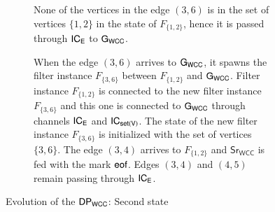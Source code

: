 \begin{figure}[h!]
\centering
\begin{subfigure}[b]{\textwidth}
 \centering
  \caption{None of the vertices in the edge $(3,6)$ is in the set of vertices $\{1,2\}$ in the state of $F_{\{1,2\}}$, hence it is passed through $\mathsf{IC_E}$ to $\mathsf{G_{WCC}}$.}
  \label{fig:dp_example_3_4a}
\end{subfigure}
\vspace{.3cm}

\begin{subfigure}[b]{\textwidth}
 \centering
  \caption{When the edge $(3,6)$ arrives to $\mathsf{G_{WCC}}$, it spawns the filter instance $F_{\{3,6\}}$  between $F_{\{1,2\}}$ and $\mathsf{G_{WCC}}$. Filter instance $F_{\{1,2\}}$ is connected to the new filter instance $F_{\{3,6\}}$ and this one is connected to  $\mathsf{G_{WCC}}$ through channels $\mathsf{IC_E}$ and  $\mathsf{IC_{set(V)}}$. The state of the new filter instance $F_{\{3,6\}}$ is initialized with the set of vertices $\{3,6\}$. The edge $(3,4)$ arrives to $F_{\{1,2\}}$  and $\mathsf{Sr_{WCC}}$ is fed with the mark $\mathsf{eof}$. Edges $(3,4)$ and $(4,5)$ remain passing through $\mathsf{IC_E}$.}
  \label{fig:dp_example_3_4b}
\end{subfigure}
\caption[{[PoC] $\dpwcc$ Evolving second state}]{Evolution of the $\dpwcc$: Second state}
\label{fig:dp_example_3_4}
\end{figure}
\vspace{.5cm}

